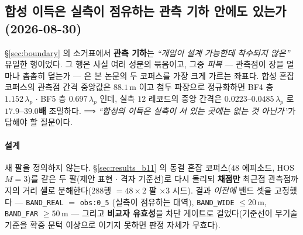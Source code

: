 \documentclass[11pt]{report}
\numberwithin{equation}{chapter}
\numberwithin{figure}{chapter}
\numberwithin{table}{chapter}
\begin{document}
\subsection{합성 이득은 실측이 점유하는 관측 기하 안에도 있는가 (2026-08-30)}
\label{sec:results_m10}

\S\ref{sec:boundary} 의 소거표에서 \textbf{관측 기하}는 \emph{``개입이 설계 가능한데
착수되지 않은''} 유일한 행이었다. 그 행은 사실 여러 성분의 묶음이고, 그중 \emph{피복}
--- 관측점이 장을 얼마나 촘촘히 덮는가 --- 은 본 논문의 두 코퍼스를 가장 크게 가르는
좌표다. 합성 혼잡 코퍼스의 관측점 간격 중앙값은 $88.1$\,m 이고 첨두 파장으로 정규화하면
BF4 층 $1.152\,\lambda_p$ $\cdot$ BF5 층 $0.697\,\lambda_p$ 인데, 실측 $12$ 레코드의
중앙 간격은 $0.0223$--$0.0485\,\lambda_p$ 로 \textbf{$17.9$--$39.0$배} 조밀하다.
⟹ \emph{``합성의 이득은 실측이 서 있는 곳에는 없는 것 아닌가''}가 답해야 할 질문이다.

\paragraph{설계}
새 팔을 정의하지 않는다. \S\ref{sec:results_b11} 의 동결 혼잡 코퍼스($48$ 에피소드,
HOS $M{=}3$)를 같은 두 팔(제안 표현 $\cdot$ 격자 기준선)로 다시 돌리되 \textbf{채점만}
최근접 관측점까지의 거리 셸로 분해한다($288$행 $=48 \times 2$ 팔 $\times 3$ 시드).
결과 \emph{이전에} 밴드 셋을 고정했다 --- \texttt{BAND\_REAL} $=$ \texttt{obs:0\_5}
(실측이 점유하는 대역), \texttt{BAND\_WIDE} $\le 20$\,m, \texttt{BAND\_FAR} $\ge 50$\,m
--- 그리고 \textbf{비교자 유효성}을 차단 게이트로 걸었다(기준선이 무기술 기준을 확증
문턱 이상으로 이기지 못하면 판정 자체가 무효다).
\end{document}
